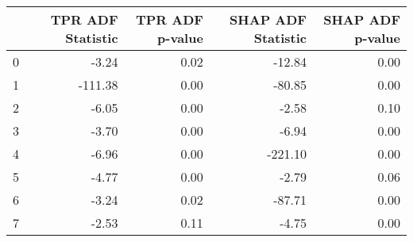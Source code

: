 \begin{tabular}{lrrrr}
\toprule
 & TPR ADF Statistic & TPR ADF p-value & SHAP ADF Statistic & SHAP ADF p-value \\
\midrule
0 & -3.24 & 0.02 & -12.84 & 0.00 \\
1 & -111.38 & 0.00 & -80.85 & 0.00 \\
2 & -6.05 & 0.00 & -2.58 & 0.10 \\
3 & -3.70 & 0.00 & -6.94 & 0.00 \\
4 & -6.96 & 0.00 & -221.10 & 0.00 \\
5 & -4.77 & 0.00 & -2.79 & 0.06 \\
6 & -3.24 & 0.02 & -87.71 & 0.00 \\
7 & -2.53 & 0.11 & -4.75 & 0.00 \\
\bottomrule
\end{tabular}
